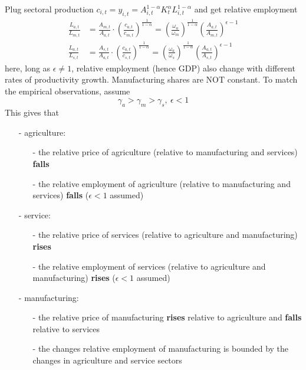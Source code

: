 \documentclass[10pt,landscape,a4paper]{article}
\begin{document}
\begin{multicols*}{3}
\begin{itemize}
Plug sectoral production $c_{i,t}=y_{i,t}=A_{i,t}^{1-\alpha}K_t^{\alpha}L_{i,t}^{1-\alpha}$ and get relative employment
\begin{align*}
\frac{L_{a,t}}{L_{m,t}} & = \frac{A_{m,t}}{A_{a,t}}\cdot \left(\frac{c_{a,t}}{c_{m,t}}\right)^{\frac{1}{1-\alpha}} = \left(\frac{\omega_a}{\omega_m}\right)^{\frac{1}{1-\alpha}}\left(\frac{A_{a,t}}{A_{m,t}}\right)^{\epsilon-1}\\
    \frac{L_{a,t}}{L_{s,t}} & = \frac{A_{s,t}}{A_{a,t}}\cdot \left(\frac{c_{a,t}}{c_{s,t}}\right)^{\frac{1}{1-\alpha}} = \left(\frac{\omega_a}{\omega_s}\right)^{\frac{1}{1-\alpha}}\left(\frac{A_{a,t}}{A_{s,t}}\right)^{\epsilon-1}
\end{align*}
here, long as $\epsilon \neq 1$, relative employment (hence GDP) also change with different rates of productivity growth. Manufacturing shares are NOT constant. To match the empirical observations, assume 
$$
\gamma_a > \gamma_m >\gamma_s,\ \epsilon<1
$$
This gives that
\begin{itemize}
    \item[-] agriculture: 
    \begin{itemize}
        \item[-]the relative price of agriculture (relative to manufacturing and services)  \textbf{falls}
        \item[-]the relative employment of agriculture (relative to manufacturing and services) \textbf{falls} ($\epsilon<1$ assumed)
    \end{itemize}
    \item[-] service:
    \begin{itemize}
        \item[-] the relative price of services (relative to agriculture and manufacturing) \textbf{rises}
        \item[-] the relative employment of services (relative to agriculture and manufacturing) \textbf{rises} ($\epsilon<1$ assumed)
    \end{itemize}
    \item[-] manufacturing:
    \begin{itemize}
        \item[-] the relative price of manufacturing \textbf{rises} relative to agriculture and \textbf{falls} relative to services
        \item[-] the changes relative employment of manufacturing is bounded by the changes in agriculture and service sectors
    \end{itemize}
\end{itemize}
\end{itemize}


\end{multicols*}
\end{document}
